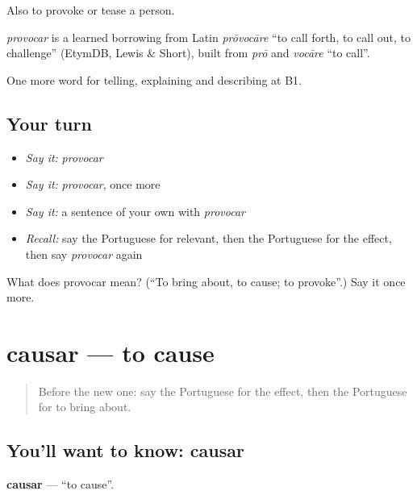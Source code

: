 Also to provoke or tease a person.

\begin{cousinweb}
\emph{provocar} is a learned borrowing from Latin \emph{prōvocāre} \textquotedblleft{}to call forth, to call out, to challenge\textquotedblright{} (EtymDB, Lewis \& Short), built from \emph{prō} and \emph{vocāre} \textquotedblleft{}to call\textquotedblright{}.
\end{cousinweb}

\begin{grammarlens}[title={What you've built}]
One more word for telling, explaining and describing at B1.
\end{grammarlens}

\subsection*{Your turn}
\begin{itemize}
\raggedright
  \item \emph{Say it:} \emph{provocar}
  \item \emph{Say it:} \emph{provocar}, once more
  \item \emph{Say it:} a sentence of your own with \emph{provocar}
  \item \emph{Recall:} say the Portuguese for relevant, then the Portuguese for the effect, then say \emph{provocar} again
\end{itemize}

\begin{tcolorbox}[breakable,colback=teal!4,colframe=teal!35!black,title={Before you move on}]
What does provocar mean? (\textquotedblleft{}To bring about, to cause; to provoke\textquotedblright{}.) Say it once more.
\end{tcolorbox}
\section[causar]{causar — to cause}

\label{lesson:PT-C348-causar}



\begin{quote}
Before the new one: say the Portuguese for the effect, then the Portuguese for to bring about.
\end{quote}

\subsection*{You'll want to know: causar}
\textbf{causar} — \textquotedblleft{}to cause\textquotedblright{}.

